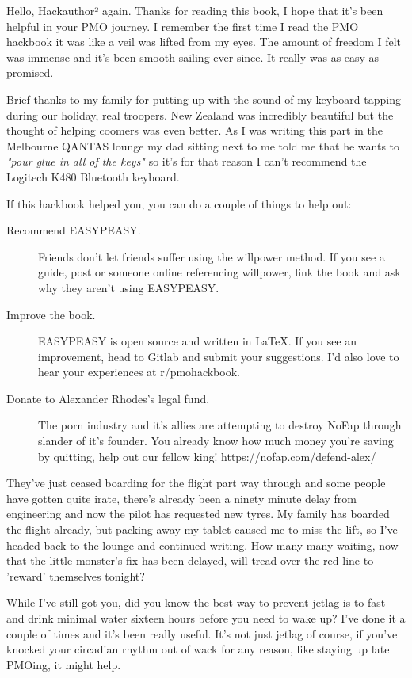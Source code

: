 \documentclass[easypeasy.tex]{subfiles}
\begin{document}
Hello, Hackauthor² again. Thanks for reading this book, I hope that it's been helpful in your PMO journey. I remember the first time I read the PMO hackbook it was like a veil was lifted from my eyes. The amount of freedom I felt was immense and it's been smooth sailing ever since. It really was as easy as promised.

Brief thanks to my family for putting up with the sound of my keyboard tapping during our holiday, real troopers. New Zealand was incredibly beautiful but the thought of helping coomers was even better. As I was writing this part in the Melbourne QANTAS lounge my dad sitting next to me told me that he wants to \textit{"pour glue in all of the keys"} so it's for that reason I can't recommend the Logitech K480 Bluetooth keyboard.

If this hackbook helped you, you can do a couple of things to help out:
  \begin{description}
  \item [Recommend EASYPEASY.] Friends don't let friends suffer using the willpower method. If you see a guide, post or someone online referencing willpower, link the book and ask why they aren't using EASYPEASY.

  \item [Improve the book.] EASYPEASY is open source and written in LaTeX. If you see an improvement, head to Gitlab and submit your suggestions. I'd also love to hear your experiences at r/pmohackbook.

  \item [Donate to Alexander Rhodes's legal fund.] The porn industry and it's allies are attempting to destroy NoFap through slander of it's founder. You already know how much money you're saving by quitting, help out our fellow king! https://nofap.com/defend-alex/
  \end{description}

They've just ceased boarding for the flight part way through and some people have gotten quite irate, there's already been a ninety minute delay from engineering and now the pilot has requested new tyres. My family has boarded the flight already, but packing away my tablet caused me to miss the lift, so I've headed back to the lounge and continued writing. How many many waiting, now that the little monster's fix has been delayed, will tread over the red line to 'reward' themselves tonight?

While I've still got you, did you know the best way to prevent jetlag is to fast and drink minimal water sixteen hours before you need to wake up? I've done it a couple of times and it's been really useful. It's not just jetlag of course, if you've knocked your circadian rhythm out of wack for any reason, like staying up late PMOing, it might help.
\end{document}
